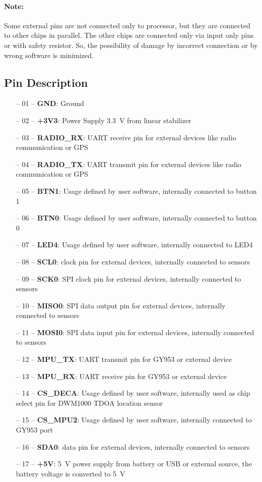 \paragraph{Note:} Some external pins are not connected only to processor, but they are connected to other chips in parallel. The other chips are connected only via input only pins or with safety resistor. So, the possibility of damage by incorrect connection or by wrong software is minimized.

\subsection{Pin Description}
\begin{itemize}
	\setlength\itemsep{0.2em}
	\item[--] 01 -- \textbf{GND}: Ground
	\item[--] 02 -- \textbf{+3V3}: Power Supply \SI{+3.3}{V} from linear stabilizer
	\item[--] 03 -- \textbf{RADIO\_RX}: UART receive pin for external devices like radio communication or GPS
	\item[--] 04 -- \textbf{RADIO\_TX}: UART transmit pin for external devices like radio communication or GPS
	\item[--] 05 -- \textbf{BTN1}: Usage defined by user software, internally connected to button 1
	\item[--] 06 -- \textbf{BTN0}: Usage defined by user software, internally connected to button 0
	\item[--] 07 -- \textbf{LED4}: Usage defined by user software, internally connected to LED4
	\item[--] 08 -- \textbf{SCL0}: \itwoc clock pin for external devices, internally connected to sensors
	\item[--] 09 -- \textbf{SCK0}: SPI clock pin for external devices, internally connected to sensors
	\item[--] 10 -- \textbf{MISO0}: SPI data output pin for external devices, internally connected to sensors
	\item[--] 11 -- \textbf{MOSI0}: SPI data input pin for external devices, internally connected to sensors
	\item[--] 12 -- \textbf{MPU\_TX}: UART transmit pin for GY953 or external device
	\item[--] 13 -- \textbf{MPU\_RX}: UART receive pin for GY953 or external device
	\item[--] 14 -- \textbf{CS\_DECA}: Usage defined by user software, internally used as chip select pin for DWM1000 TDOA location sensor
	\item[--] 15 -- \textbf{CS\_MPU2}: Usage defined by user software, internally connected to GY953 port
	\item[--] 16 -- \textbf{SDA0}: \itwoc data pin for external devices, internally connected to sensors
	\item[--] 17 -- \textbf{+5V}: \SI{+5}{V} power supply from battery or \ac{USB} or external source, the battery voltage is converted to \SI{5}{V}
\end{itemize}

